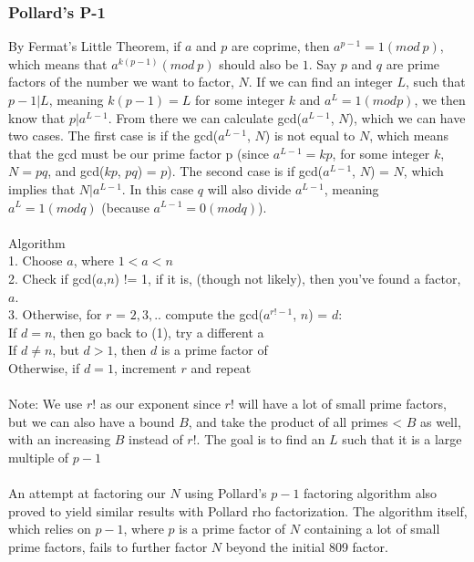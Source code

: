 \documentclass[12pt]{article} %
\begin{document}
\subsubsection{Pollard's P-1}
By Fermat’s Little Theorem, if $a$ and $p$ are coprime, then $a^{p-1} = 1(mod\ p)$, which means that $a^{k(p-1)} (mod\ p)$ should also be $1$. Say $p$ and $q$ are prime factors of the number we want to factor, $N$. If we can find an integer $L$, such that $p-1| L$, meaning $k(p-1) = L$ for some integer $k$ and $a^{L} = 1(mod p)$, we then know that $p|a^{L-1}$. From there we can calculate gcd($a^{L-1}$, $N$), which we can have two cases. The first case is if the gcd($a^{L-1}$, $N$) is not equal to $N$, which means that the gcd must be our prime factor p (since $a^{L-1} = kp$, for some integer $k$, $N = pq$, and gcd($kp$, $pq$) = $p$). The second case is if gcd($a^{L-1}$, $N$) = $N$, which implies that $N| a^{L-1}$. In this case $q$ will also divide $a^{L-1}$, meaning $a^{L} = 1(mod q)$ (because $a^{L-1} = 0(mod q)$).
\\\\Algorithm
	\\1. Choose $a$, where $1<a<n$
	\\2. Check if gcd($a$,$n$) != 1, if it is, (though not likely), then you’ve found a factor, $a$.
	\\3. Otherwise, for $r$ = $2,3,..$ compute the gcd($a^{r!-1}$, $n$) = $d$:
	\\If $d = n$, then go back to (1), try a different a
	\\If $d \ne n$, but $d > 1$,  then $d$ is a prime factor of 
	\\Otherwise, if $d = 1$, increment $r$ and repeat
\\\\
Note: We use $r!$ as our exponent since $r!$ will have a lot of small prime factors, but we can also have a bound $B$, and take the product of all primes < $B$ as well, with an increasing $B$ instead of $r!$. The goal is to find an $L$ such that it is a large multiple of $p-1$
\\\\An attempt at factoring our $N$ using Pollard’s $p-1$ factoring algorithm also proved to yield similar results with Pollard rho factorization. The algorithm itself, which relies on $p-1$, where $p$ is a prime factor of $N$ containing a lot of small prime factors, fails to further factor $N$ beyond the initial 809 factor.
\end{document}
